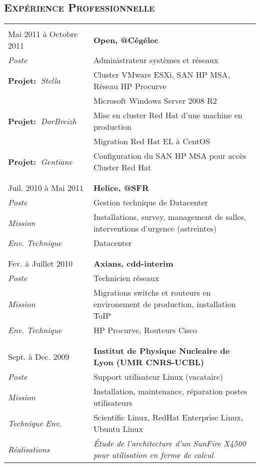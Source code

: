 \documentclass[a4paper,8pt]{article}
\newcommand{\hsubsection}[1]{\subsection*{\fontfamily{phv}\selectfont\textsc{#1}}}
\begin{document}
\hsubsection{Expérience Professionnelle}
\begin{tabular}{P{3.5cm}|p{13cm}}
 & \\
Mai 2011	à Octobre 2011     & \textbf{Open, @Cégélec}\\
\textsl{Poste}      & Administrateur systèmes et réseaux\\
\textbf{Projet:~}\textit{Stella}     & Cluster VMware ESXi, SAN HP MSA, Réseau HP Procurve \\
                    & Microsoft Windows Server 2008 R2\\
\textbf{Projet:~}\textit{DorBreizh}  & Mise en cluster Red Hat d'une machine en production\\
                    & Migration Red Hat EL à CentOS\\
\textbf{Projet:~}\textit{Gentiane}   & Configuration du SAN HP MSA pour accès Cluster Red Hat\\
 & \\
 & \\
Juil. 2010	à Mai 2011	& \textbf{Helice, @SFR}\\
\textsl{Poste}			& Gestion technique de Datacenter\\
\textsl{Mission}		& Installations, survey, management de salles, interventions d'urgence (astreintes)\\
\textsl{Env. Technique}		& Datacenter\\
 & \\
 & \\
Fev. à Juillet 2010		& \textbf{Axians, cdd-interim}\\
\textsl{Poste}	 		& Technicien réseaux\\
\textsl{Mission}		& Migrations switchs et routeurs en environement de production, installation ToIP\\
\textsl{Env. Technique}		& HP Procurve, Routeurs Cisco\\
 & \\
 & \\
Sept. à Dec. 2009		& \textbf{Institut de Physique Nucleaire de Lyon (UMR CNRS-UCBL)}\\
\textsl{Poste}	 		& Support utilisateur Linux (vacataire)\\
\textsl{Mission} 		& Installation, maintenance, réparation postes utilisateurs\\
\textsl{Technique Env.} 	& Scientific Linux, RedHat Enterprise Linux, Ubuntu Linux\\
\textsl{Réalisations}		& \textsl{\'{E}tude de l'architecture d'un SunFire X4500 pour utilisation en ferme de calcul}\\

\end{tabular}
\end{document}

